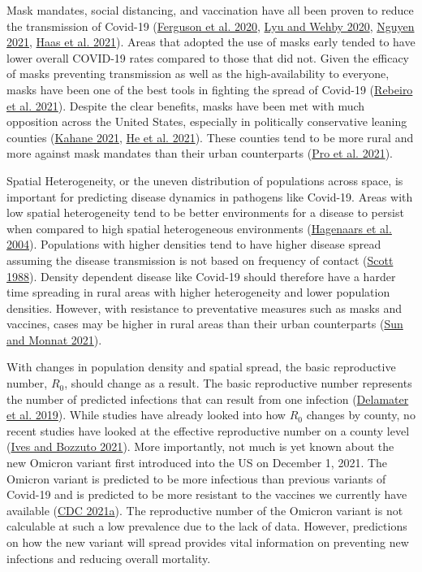 \documentclass[
  12pt,
]{article}
\begin{document}
Mask mandates, social distancing, and vaccination have all been proven to reduce the transmission of Covid-19 (\protect\hyperlink{ref-ferguson_report_2020}{Ferguson et al. 2020}, \protect\hyperlink{ref-lyu_community_2020}{Lyu and Wehby 2020}, \protect\hyperlink{ref-nguyen_mask_2021}{Nguyen 2021}, \protect\hyperlink{ref-haas_infections_2021}{Haas et al. 2021}). Areas that adopted the use of masks early tended to have lower overall COVID-19 rates compared to those that did not. Given the efficacy of masks preventing transmission as well as the high-availability to everyone, masks have been one of the best tools in fighting the spread of Covid-19 (\protect\hyperlink{ref-rebeiro_impact_2021}{Rebeiro et al. 2021}). Despite the clear benefits, masks have been met with much opposition across the United States, especially in politically conservative leaning counties (\protect\hyperlink{ref-kahane_politicizing_2021}{Kahane 2021}, \protect\hyperlink{ref-he_why_2021}{He et al. 2021}). These counties tend to be more rural and more against mask mandates than their urban counterparts (\protect\hyperlink{ref-pro_us_2021}{Pro et al. 2021}).

Spatial Heterogeneity, or the uneven distribution of populations across space, is important for predicting disease dynamics in pathogens like Covid-19. Areas with low spatial heterogeneity tend to be better environments for a disease to persist when compared to high spatial heterogeneous environments (\protect\hyperlink{ref-hagenaars_spatial_2004}{Hagenaars et al. 2004}). Populations with higher densities tend to have higher disease spread assuming the disease transmission is not based on frequency of contact (\protect\hyperlink{ref-scott_impact_1988}{Scott 1988}). Density dependent disease like Covid-19 should therefore have a harder time spreading in rural areas with higher heterogeneity and lower population densities. However, with resistance to preventative measures such as masks and vaccines, cases may be higher in rural areas than their urban counterparts (\protect\hyperlink{ref-sun_rural-urban_2021}{Sun and Monnat 2021}).

With changes in population density and spatial spread, the basic reproductive number, \(R_0\), should change as a result. The basic reproductive number represents the number of predicted infections that can result from one infection (\protect\hyperlink{ref-delamater_complexity_2019}{Delamater et al. 2019}). While studies have already looked into how \(R_0\) changes by county, no recent studies have looked at the effective reproductive number on a county level (\protect\hyperlink{ref-ives_estimating_2021}{Ives and Bozzuto 2021}). More importantly, not much is yet known about the new Omicron variant first introduced into the US on December 1, 2021. The Omicron variant is predicted to be more infectious than previous variants of Covid-19 and is predicted to be more resistant to the vaccines we currently have available (\protect\hyperlink{ref-cdc_omicron_2021}{CDC 2021a}). The reproductive number of the Omicron variant is not calculable at such a low prevalence due to the lack of data. However, predictions on how the new variant will spread provides vital information on preventing new infections and reducing overall mortality.
\end{document}
